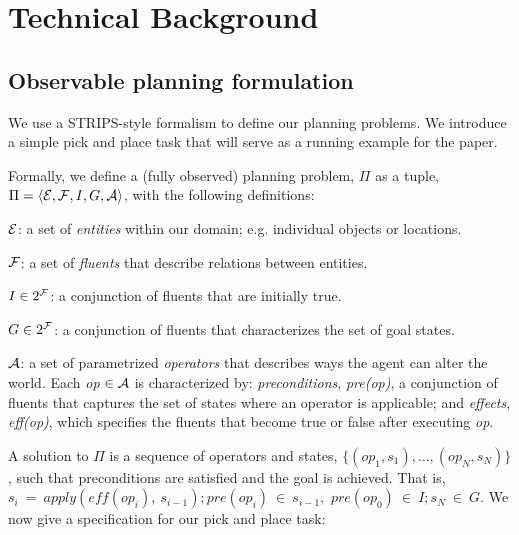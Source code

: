 \section{Technical Background}
\subsection{Observable planning formulation}
\label{sec-formulation}
We use a STRIPS-style formalism to define our planning problems. We
introduce a simple pick and place task that will serve as a running
example for the paper. 

Formally, we define a (fully observed) planning problem, $\Pi$ as a tuple, $\Pi =
\langle \mathcal{E}, \mathcal{F}, I, G, \mathcal{A} \rangle$, with the following definitions:
\begin{tightlist}
\item[$\mathcal{E}$:] a set of \emph{entities} within our domain; e.g. individual objects or locations.
\item[$\mathcal{F}$:] a set of \emph{fluents} that describe relations between
  entities.
\item[$I \in 2^{\mathcal{F}}$:] a conjunction of fluents that are initially true.
\item[$G \in 2^{\mathcal{F}}$:] a conjunction of fluents that characterizes the set of goal states.
\item[$\mathcal{A}$:] a set of parametrized \emph{operators} that describes
  ways the agent can alter the world. Each \emph{op} $\in \mathcal{A}$ is characterized by:
  \emph{preconditions}, \emph{pre(op)}, a conjunction of fluents that captures the set of states where an operator is applicable; and \emph{effects}, \emph{eff(op)}, which specifies the fluents that become true or false after executing \emph{op}.
\end{tightlist}
A solution to $\Pi$ is a sequence of operators and states, $\{(op_1,
s_1),\ldots,(op_N, s_N)\}$, such that preconditions are satisfied and
the goal is achieved. That is, $s_i~=~apply(eff(op_i),~s_{i-1});
pre(op_i)~\in~s_{i-1},$ $pre(op_0)~\in~I; s_N~\in~G$. We now give
a specification for our pick and place task:
